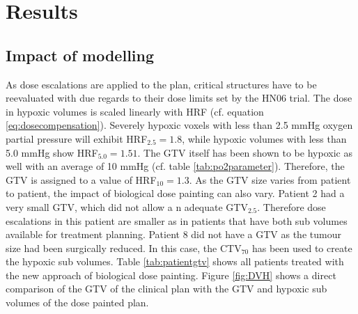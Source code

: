 \section{Results}
\subsection{Impact of modelling}
As dose escalations are applied to the plan, critical structures have to be reevaluated with due regards to their dose limits set by the HN06 trial. The dose in hypoxic volumes is scaled linearly with HRF (cf. equation \ref{eq:dosecompensation}). Severely hypoxic voxels with less than 2.5 mmHg oxygen partial pressure will exhibit HRF$_{2.5}=1.8$, while hypoxic volumes with less than 5.0 mmHg show HRF$_{5.0}=1.51$. The GTV itself has been shown to be hypoxic as well with an average of 10 mmHg (cf. table \ref{tab:po2parameter}). Therefore, the GTV is assigned to a value of HRF$_\mathrm{10}=1.3$. As the GTV size varies from patient to patient, the impact of biological dose painting can also vary. Patient 2 had a very small GTV, which did not allow a n adequate GTV$_{2.5}$. Therefore dose escalations in this patient are smaller as in patients that have both sub volumes available for treatment planning. Patient 8 did not have a GTV as the tumour size had been surgically reduced. In this case, the CTV$_{70}$ has been used to create the hypoxic sub volumes. Table \ref{tab:patientgtv} shows all patients treated with the new approach of biological dose painting. Figure \ref{fig:DVH} shows a direct comparison of the GTV of the clinical plan with the GTV and hypoxic sub volumes of the dose painted plan. 
\begin{sidewaysfigure}[p]
\centering
{}
\caption{Dose volume histograms for the GTV of the clinical plan (green) and all volumes from biological dose painting: GTV (red), GTV$_{5.0}$ (blue), GTV$_{2.5}$ (magenta). Patient 2 did not have a GTV$_{2.5}$ as the GTV was to small.}
\label{fig:DVH}
\end{sidewaysfigure}
